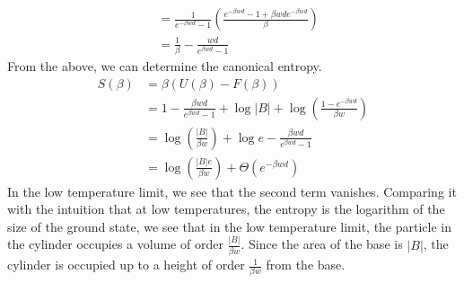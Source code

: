 \documentclass[letterpaper,english,10pt]{article}
\begin{document}
\begin{exmp}[Cylinder]
\begin{align}
	&= \frac{1}{e^{-\beta wd} - 1} \left( \frac{e^{-\beta wd} - 1 + \beta wd e^{-\beta wd}}{\beta} \right) \nonumber \\
	&= \frac{1}{\beta} - \frac{wd}{e^{\beta wd} - 1}
\end{align}
From the above, we can determine the canonical entropy.
\begin{align}
S(\beta) &= \beta (U(\beta) - F(\beta)) \nonumber \\
	&= 1 - \frac{\beta wd}{e^{\beta wd} - 1} + \log |B| + \log \left( \frac{1 - e^{- \beta wd}}{\beta w} \right) \nonumber \\
	&= \log \left( \frac{|B|}{\beta w} \right) + \log e - \frac{\beta wd}{e^{\beta wd} - 1} \nonumber \\
	&= \log \left( \frac{|B|e}{\beta w} \right) + \Theta(e^{- \beta wd})
\end{align}
In the low temperature limit, we see that the second term vanishes. Comparing it with the intuition that at low temperatures, the entropy is the logarithm of the size of the ground state, we see that in the low temperature limit, the particle in the cylinder occupies a volume of order $\frac{|B|}{\beta w}$. Since the area of the base is $|B|$, the cylinder is occupied up to a height of order $\frac{1}{\beta w}$ from the base.
\end{exmp}
\end{document}
